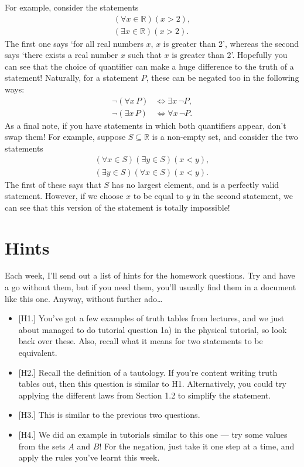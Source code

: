\documentclass[
  12pt,
  a4paper]{extarticle}
\providecommand{\tightlist}{%
  \setlength{\itemsep}{0pt}\setlength{\parskip}{0pt}}
\theoremstyle{plain}
\theoremstyle{definition}
\theoremstyle{plain}
\theoremstyle{plain}
\theoremstyle{plain}
\theoremstyle{plain}
\theoremstyle{definition}
\theoremstyle{definition}
\newtheorem*{Order Axioms*}{Order Axioms}\newtheorem{Order Axioms}{Order Axioms}[section]
\theoremstyle{remark}
\theoremstyle{remark}
\renewcommand{\;}{\,}
\begin{document}
For example, consider the statements
\begin{align*}
    (\forall x \in \mathbb{R})(x > 2),\\
    (\exists x \in \mathbb{R})(x > 2).
\end{align*}
The first one says `for all real numbers \(x\), \(x\) is greater than 2', whereas the second says `there exists a real number \(x\) such that \(x\) is greater than 2'. Hopefully you can see that the choice of quantifier can make a huge difference to the truth of a statement! Naturally, for a statement \(P\), these can be negated too in the following ways:
\begin{align*}
    \neg(\forall x \; P) &\Leftrightarrow \exists x \; \neg P,\\
    \neg(\exists x \; P) &\Leftrightarrow \forall x\;  \neg P.
\end{align*}
As a final note, if you have statements in which both quantifiers appear, don't swap them! For example, suppose \(S \subseteq \mathbb{R}\) is a non-empty set, and consider the two statements
\begin{align*}
    (\forall x \in S)(\exists y \in S)(x < y),\\
    (\exists y \in S)(\forall x \in S)(x < y).
\end{align*}
The first of these says that \(S\) has no largest element, and is a perfectly valid statement. However, if we choose \(x\) to be equal to \(y\) in the second statement, we can see that this version of the statement is totally impossible!

\hypertarget{hints}{%
\section{Hints}\label{hints}}

Each week, I'll send out a list of hints for the homework questions. Try and have a go without them, but if you need them, you'll usually find them in a document like this one. Anyway, without further ado\ldots{}

\begin{itemize}
\tightlist
\item
  {[}H1.{]} You've got a few examples of truth tables from lectures, and we just about managed to do tutorial question 1a) in the physical tutorial, so look back over these. Also, recall what it means for two statements to be equivalent.
\item
  {[}H2.{]} Recall the definition of a tautology. If you're content writing truth tables out, then this question is similar to H1. Alternatively, you could try applying the different laws from Section 1.2 to simplify the statement.
\item
  {[}H3.{]} This is similar to the previous two questions.
\item
  {[}H4.{]} We did an example in tutorials similar to this one --- try some values from the sets \(A\) and \(B\)! For the negation, just take it one step at a time, and apply the rules you've learnt this week.
\end{itemize}
\end{document}
